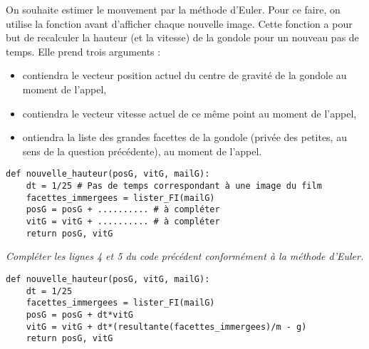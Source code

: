 On souhaite estimer le mouvement par la méthode d’Euler. Pour ce faire, on utilise la fonction  avant d’afficher chaque nouvelle image. Cette fonction a pour but de recalculer la hauteur (et la vitesse) de la gondole pour un nouveau pas de temps. Elle prend trois arguments :

\begin{itemize}
\item {} contiendra le vecteur position actuel du centre de gravité de la gondole au moment de
l’appel,
\item {} contiendra le vecteur vitesse actuel de ce même point au moment de l’appel,
\item {}  ontiendra la liste des grandes facettes de la gondole (privée des petites, au sens de la
question précédente), au moment de l’appel.
\end{itemize}
\begin{lstlisting}
def nouvelle_hauteur(posG, vitG, mailG):
    dt = 1/25 # Pas de temps correspondant à une image du film
    facettes_immergees = lister_FI(mailG)
    posG = posG + .......... # à compléter
    vitG = vitG + .......... # à compléter
    return posG, vitG
\end{lstlisting}
\begin{Exercise}\it 
Compléter les lignes 4 et 5 du code précédent conformément à la méthode d’Euler.
\end{Exercise}
\begin{Answer}
\begin{lstlisting}
def nouvelle_hauteur(posG, vitG, mailG):
    dt = 1/25 
    facettes_immergees = lister_FI(mailG)
    posG = posG + dt*vitG 
    vitG = vitG + dt*(resultante(facettes_immergees)/m - g)
    return posG, vitG
\end{lstlisting}
\end{Answer}



